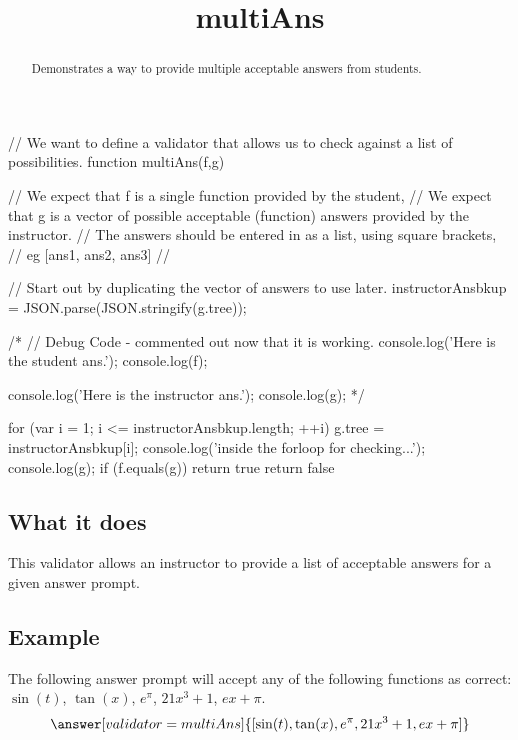 \documentclass{ximera}
\title{multiAns}
\begin{document}
\begin{abstract}
    Demonstrates a way to provide multiple acceptable answers from students.
\end{abstract}
\maketitle

\begin{javascript}
// We want to define a validator that allows us to check against a list of possibilities.
function multiAns(f,g) {
    // We expect that f is a single function provided by the student,
    // We expect that g is a vector of possible acceptable (function) answers provided by the instructor.
    //      The answers should be entered in as a list, using square brackets,
    //      eg [ans1, ans2, ans3]
    //
    
    // Start out by duplicating the vector of answers to use later.
    instructorAnsbkup = JSON.parse(JSON.stringify(g.tree));
    
    /* //   Debug Code - commented out now that it is working.
    console.log('Here is the student ans.');
    console.log(f);
    
    console.log('Here is the instructor ans.');
    console.log(g);
    */
    
    for (var i = 1; i <= instructorAnsbkup.length; ++i) {
        g.tree = instructorAnsbkup[i];
        console.log('inside the forloop for checking...');
        console.log(g);
        if (f.equals(g)){
            return true
        }
    }
return false
}
  
\end{javascript}

\subsection*{What it does}
    This validator allows an instructor to provide a list of acceptable answers for a given answer prompt.


\subsection*{Example}
    \begin{problem}
        The following answer prompt will accept any of the following functions as correct: $\sin(t)$, $\tan(x)$, $e^\pi$, $21x^3 + 1$, $ex + \pi$.
        \[
            \answer[validator=multiAns]{[\sin(t),\tan(x),e^\pi,21x^3 + 1,ex + \pi]}
        \]
    \end{problem}
\end{document}
